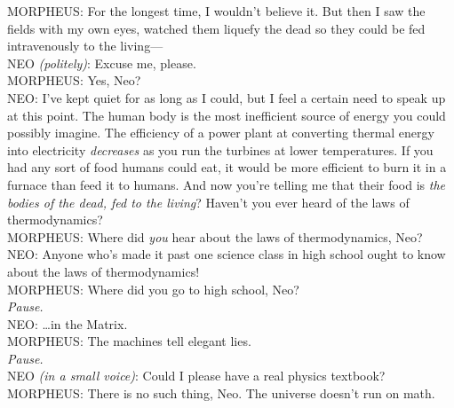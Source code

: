 \begin{playdialog}
MORPHEUS: For the longest time, I wouldn't believe it. But then I saw the fields with my own eyes, watched them liquefy the dead so they could be fed intravenously to the living—\\

NEO \emph{(politely)}: Excuse me, please.\\

MORPHEUS: Yes, Neo?\\

NEO: I've kept quiet for as long as I could, but I feel a certain need to speak up at this point. The human body is the most inefficient source of energy you could possibly imagine. The efficiency of a power plant at converting thermal energy into electricity \emph{decreases} as you run the turbines at lower temperatures. If you had any sort of food humans could eat, it would be more efficient to burn it in a furnace than feed it to humans. And now you're telling me that their food is \emph{the bodies of the dead, fed to the living}? Haven't you ever heard of the laws of thermodynamics?\\

MORPHEUS: Where did \emph{you} hear about the laws of thermodynamics, Neo?\\

NEO: Anyone who's made it past one science class in high school ought to know about the laws of thermodynamics!\\

MORPHEUS: Where did you go to high school, Neo?\\

\emph{Pause.}\\

NEO: {\ldots}in the Matrix.\\

MORPHEUS: The machines tell elegant lies.\\

\emph{Pause.}\\

NEO \emph{(in a small voice)}: Could I please have a real physics textbook?\\

MORPHEUS: There is no such thing, Neo. The universe doesn't run on math.\\
\end{playdialog}

